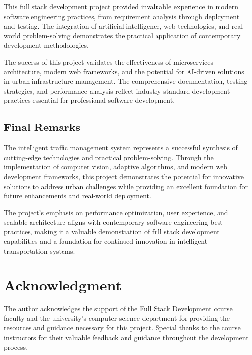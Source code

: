 \documentclass[conference]{IEEEtran}
\begin{document}
This full stack development project provided invaluable experience in modern software engineering practices, from requirement analysis through deployment and testing. The integration of artificial intelligence, web technologies, and real-world problem-solving demonstrates the practical application of contemporary development methodologies.

The success of this project validates the effectiveness of microservices architecture, modern web frameworks, and the potential for AI-driven solutions in urban infrastructure management. The comprehensive documentation, testing strategies, and performance analysis reflect industry-standard development practices essential for professional software development.

\subsection{Final Remarks}

The intelligent traffic management system represents a successful synthesis of cutting-edge technologies and practical problem-solving. Through the implementation of computer vision, adaptive algorithms, and modern web development frameworks, this project demonstrates the potential for innovative solutions to address urban challenges while providing an excellent foundation for future enhancements and real-world deployment.

The project's emphasis on performance optimization, user experience, and scalable architecture aligns with contemporary software engineering best practices, making it a valuable demonstration of full stack development capabilities and a foundation for continued innovation in intelligent transportation systems.

\section*{Acknowledgment}

The author acknowledges the support of the Full Stack Development course faculty and the university's computer science department for providing the resources and guidance necessary for this project. Special thanks to the course instructors for their valuable feedback and guidance throughout the development process.
\end{document}
